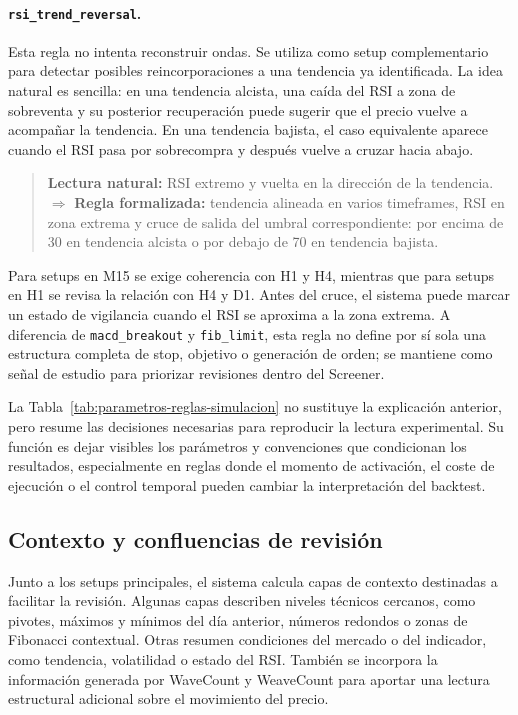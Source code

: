 \paragraph{\texttt{rsi\_trend\_reversal}.}
Esta regla no intenta reconstruir ondas. Se utiliza como setup complementario
para detectar posibles reincorporaciones a una tendencia ya identificada. La
idea natural es sencilla: en una tendencia alcista, una ca\'ida del RSI a zona de
sobreventa y su posterior recuperaci\'on puede sugerir que el precio vuelve a
acompa\~nar la tendencia. En una tendencia bajista, el caso equivalente aparece
cuando el RSI pasa por sobrecompra y despu\'es vuelve a cruzar hacia abajo.

\begin{quote}
\small
\textbf{Lectura natural:} RSI extremo y vuelta en la direcci\'on de la
tendencia.\\
\(\Rightarrow\)
\textbf{Regla formalizada:} tendencia alineada en varios timeframes,
RSI en zona extrema y cruce de salida del umbral correspondiente: por encima de
30 en tendencia alcista o por debajo de 70 en tendencia bajista.
\end{quote}

Para setups en M15 se exige coherencia con H1 y H4, mientras que para setups en
H1 se revisa la relaci\'on con H4 y D1. Antes del cruce, el sistema puede marcar
un estado de vigilancia cuando el RSI se aproxima a la zona extrema. A
diferencia de \texttt{macd\_breakout} y \texttt{fib\_limit}, esta regla no
define por s\'i sola una estructura completa de stop, objetivo o generaci\'on de
orden; se mantiene como se\~nal de estudio para priorizar revisiones dentro del
Screener.



La Tabla~\ref{tab:parametros-reglas-simulacion} no sustituye la explicaci\'on
anterior, pero resume las decisiones necesarias para reproducir la lectura
experimental. Su funci\'on es dejar visibles los par\'ametros y convenciones que
condicionan los resultados, especialmente en reglas donde el momento de
activaci\'on, el coste de ejecuci\'on o el control temporal pueden cambiar la
interpretaci\'on del backtest.

\subsection{Contexto y confluencias de revisi\'on}
\label{subsec:contexto-confluencias-revision}

Junto a los setups principales, el sistema calcula capas de contexto destinadas
a facilitar la revisi\'on. Algunas capas describen niveles t\'ecnicos cercanos,
como pivotes, m\'aximos y m\'inimos del d\'ia anterior, n\'umeros redondos o zonas
de Fibonacci contextual. Otras resumen condiciones del mercado o del
indicador, como tendencia, volatilidad o estado del RSI. Tambi\'en se incorpora
la informaci\'on generada por WaveCount y WeaveCount para aportar una lectura
estructural adicional sobre el movimiento del precio.

